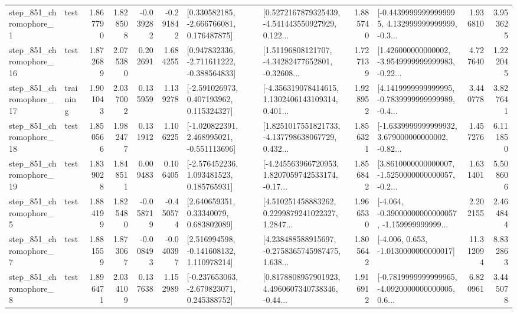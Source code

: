 \begin{tabular}{llrrrrllrlrr}
   step\_851\_chromophore\_1 &      test &      1.867790 &    1.828508 &     -0.039282 & -0.291842 &    [0.330582185, -2.666766081, 0.176487875] &  [0.5272167879325439, -4.541443550927929, 0.122... &       1.885740 &  [-0.44399999999999995, 4.132999999999999, -0.3... &            1.936810 &          3.953625 \\
  step\_851\_chromophore\_16 &      test &      1.872689 &    2.075380 &      0.202691 &  1.684255 &   [0.947832336, -2.711611222, -0.388564833] &  [1.51196808121707, -4.34282477652801, -0.32608... &       1.727139 &  [1.426000000000002, -3.9549999999999983, -0.22... &            4.727640 &          1.222045 \\
  step\_851\_chromophore\_17 &  training &      1.901043 &    2.037002 &      0.135959 &  1.139278 &    [-2.591026973, 0.407193962, 0.115324327] &  [-4.356319078414615, 1.1302406143109314, 0.401... &       1.928952 &  [4.1419999999999995, -0.7839999999999989, -0.4... &            3.440778 &          3.827641 \\
  step\_851\_chromophore\_18 &      test &      1.850566 &    1.982477 &      0.131912 &  1.106225 &   [-1.020822391, 2.468995021, -0.551113696] &  [1.8251017551821733, -4.137798638067729, 0.432... &       1.856321 &  [-1.6339999999999932, 3.679000000000002, -0.82... &            1.457276 &          6.111850 \\
  step\_851\_chromophore\_19 &      test &      1.839028 &    1.848511 &      0.009483 &  0.106405 &    [-2.576452236, 1.093481523, 0.185765931] &  [-4.245563966720953, 1.8207059742533174, -0.17... &       1.856842 &  [3.8610000000000007, -1.5250000000000057, -0.2... &            1.631401 &          5.508606 \\
   step\_851\_chromophore\_5 &      test &      1.884199 &    1.825480 &     -0.058719 & -0.450574 &      [2.640659351, 0.33340079, 0.683802089] &  [4.510251458883262, 0.2299879241022327, 1.2847... &       1.966530 &  [-4.064, -0.39000000000000057, -1.159999999999... &            2.202155 &          2.464844 \\
   step\_851\_chromophore\_7 &      test &      1.881559 &    1.873067 &     -0.008493 & -0.040397 &    [2.516994598, -0.141608132, 1.110978214] &  [4.238488588915697, -0.2758365745987475, 1.638... &       1.805642 &               [-4.006, 0.653, -1.0130000000000017] &           11.312094 &          8.832863 \\
   step\_851\_chromophore\_8 &      test &      1.896471 &    2.034109 &      0.137638 &  1.152989 &   [-0.237653063, -2.679823071, 0.245388752] &  [0.8178808957901923, 4.4960607340738346, -0.44... &       1.916912 &  [-0.7819999999999965, -4.0920000000000005, 0.6... &            6.820961 &          3.445078 \\

\end{tabular}
